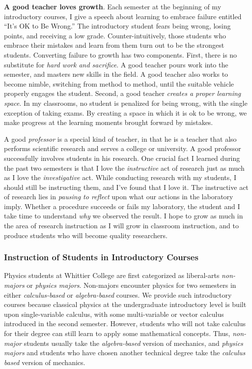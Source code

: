 \documentclass[../../main.tex]{subfiles}
\begin{document}
\textbf{A good teacher loves growth}.  Each semester at the beginning of my introductory courses, I give a speech about learning to embrace failure entitled ``It's OK to Be Wrong.''  The introductory student fears being wrong, losing points, and receiving a low grade.  Counter-intuitively, those students who embrace their mistakes and learn from them turn out to be the strongest students.  Converting failure to growth has two components.  First, there is no substitute for \textit{hard work and sacrifice}.  A good teacher pours work into the semester, and masters new skills in the field.  A good teacher also works to become nimble, switching from method to method, until the suitable vehicle properly engages the student.  Second, a good teacher \textit{creates a proper learning space}.  In my classrooms, no student is penalized for being wrong, with the single exception of taking exams.  By creating a space in which it is ok to be wrong, we make progress at the learning moments brought forward by mistakes. \\ \hspace{0.1cm}

A good \textit{professor} is a special kind of teacher, in that he is a teacher that also performs scientific research and serves a college or university.  A good professor successfully involves students in his research.  One crucial fact I learned during the past two semesters is that I love the \textit{instructive} act of research just as much as I love the \textit{investigative} act.  While conducting research with my students, I should still be instructing them, and I've found that I love it.  The instructive act of research lies in \textit{pausing to reflect} upon what our actions in the laboratory imply.  Whether a procedure succeeds or fails my laboratory, the student and I take time to understand \textit{why} we observed the result.  I hope to grow as much in the area of research instruction as I will grow in classroom instruction, and to produce students who will become quality researchers.

\subsubsection{Instruction of Students in Introductory Courses}

\label{sec:teaching_phil1}

Physics students at Whittier College are first categorized as liberal-arts \textit{non-majors} or \textit{physics majors}.  Non-majors encounter physics for two semesters in either \textit{calculus-based} or \textit{algebra-based} courses.  We provide such introductory courses because classical physics at the undergraduate introductory level is built upon single-variable calculus, with some multi-variable or vector calculus introduced in the second semester.  However, students who will not take calculus for their degree can still learn to apply some mathematical concepts.  Thus, \textit{non-major} students usually take the \textit{algebra-based} version of mechanics, and \textit{physics majors} and students who have chosen another technical degree take the \textit{calculus based} version of mechanics.  \\ \hspace{0.1cm}
\end{document}
